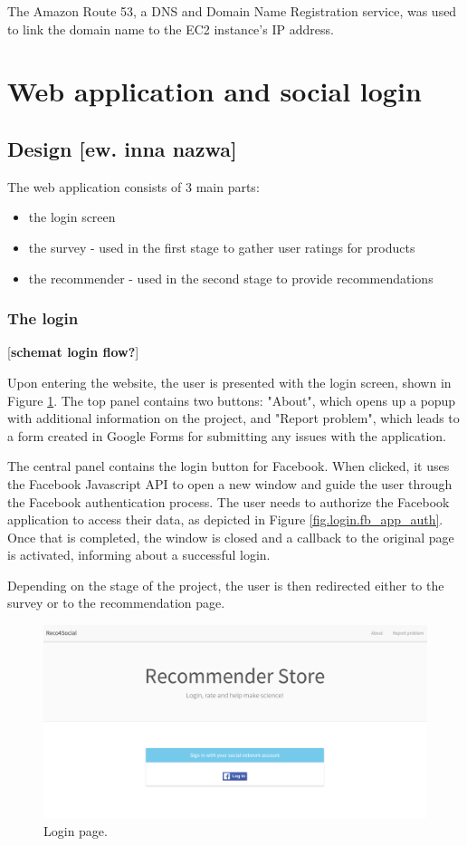 \documentclass[12pt]{report}
\begin{document}
The Amazon Route 53, a DNS and Domain Name Registration service, was used to link the domain name to the EC2 instance's IP address.

\section{Web application and social login}
\subsection{Design [ew. inna nazwa]}

The web application consists of 3 main parts:
\begin{itemize}
\item the login screen
\item the survey - used in the first stage to gather user ratings for products
\item the recommender - used in the second stage to provide recommendations
\end{itemize}

\subsubsection{The login}
[{\bf schemat login flow?}]

Upon entering the website, the user is presented with the login screen, shown in Figure \ref{fig.login}. The top panel contains two buttons: "About", which opens up a popup with additional information on the project, and "Report problem", which leads to a form created in Google Forms for submitting any issues with the application.

The central panel contains the login button for Facebook. When clicked, it uses the Facebook Javascript API to open a new window and guide the user through the Facebook authentication process. The user needs to authorize the Facebook application to access their data, as depicted in Figure \ref{fig.login.fb_app_auth}. Once that is completed, the window is closed and a callback to the original page is activated, informing about a successful login.

Depending on the stage of the project, the user is then redirected either to the survey or to the recommendation page. 

\begin{figure}[!t]
\centering
\includegraphics[width=\textwidth]{reco4_login.png} 
\caption[Login page.]{Login page.}
\label{fig.login}
\end{figure}
\end{document}
